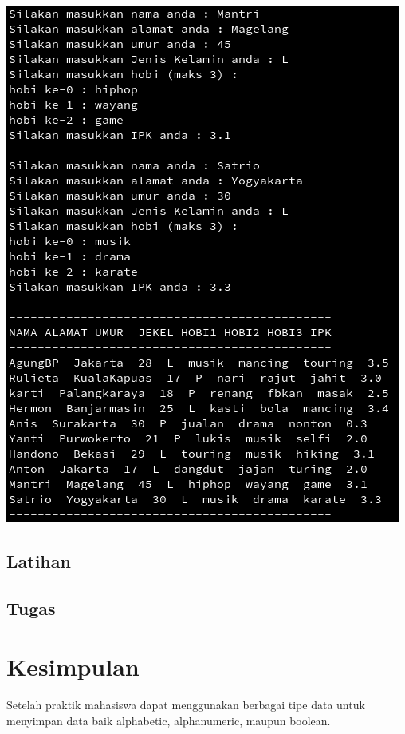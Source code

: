 \documentclass[a4paper,12pt]{article}
\begin{document}
\begin{center}
    \includegraphics[scale=1]{out-prak2-3.png} 
\end{center}

\subsection{Latihan}

\subsection{Tugas}

\newpage

\section{Kesimpulan}
Setelah praktik mahasiswa dapat menggunakan berbagai tipe data untuk menyimpan data baik alphabetic, alphanumeric,
maupun boolean.
\end{document}
